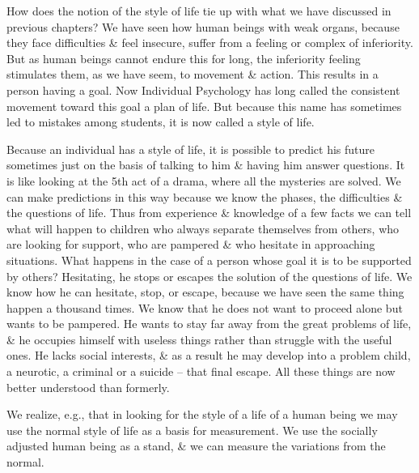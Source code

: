 \documentclass{article}
\begin{document}
How does the notion of the style of life tie up with what we have discussed in previous chapters? We have seen how human beings with weak organs, because they face difficulties \& feel insecure, suffer from a feeling or complex of inferiority. But as human beings cannot endure this for long, the inferiority feeling stimulates them, as we have seem, to movement \& action. This results in a person having a goal. Now Individual Psychology has long called the consistent movement toward this goal a plan of life. But because this name has sometimes led to mistakes among students, it is now called a style of life.

Because an individual has a style of life, it is possible to predict his future sometimes just on the basis of talking to him \& having him answer questions. It is like looking at the 5th act of a drama, where all the mysteries are solved. We can make predictions in this way because we know the phases, the difficulties \& the questions of life. Thus from experience \& knowledge of a few facts we can tell what will happen to children who always separate themselves from others, who are looking for support, who are pampered \& who hesitate in approaching situations. What happens in the case of a person whose goal it is to be supported by others? Hesitating, he stops or escapes the solution of the questions of life. We know how he can hesitate, stop, or escape, because we have seen the same thing happen a thousand times. We know that he does not want to proceed alone but wants to be pampered. He wants to stay far away from the great problems of life, \& he occupies himself with useless things rather than struggle with the useful ones. He lacks social interests, \& as a result he may develop into a problem child, a neurotic, a criminal or a suicide -- that final escape. All these things are now better understood than formerly.

We realize, e.g., that in looking for the style of a life of a human being we may use the normal style of life as a basis for measurement. We use the socially adjusted human being as a stand, \& we can measure the variations from the normal.
\end{document}

